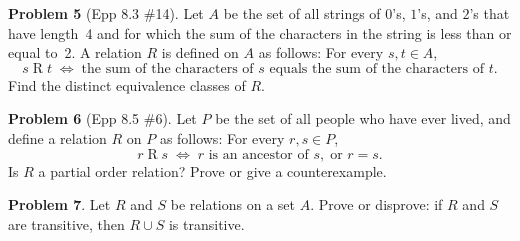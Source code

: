 \documentclass[11pt]{article}
\begin{document}
\bigskip

\noindent\textbf{Problem 5} (Epp 8.3 \#14). \;
Let $A$ be the set of all strings of $0$'s, $1$'s, and $2$'s that have length~4 and
for which the sum of the characters in the string is less than or equal to~2.
A relation $R$ is defined on $A$ as follows: For every $s, t \in A$,
\[
  s \mathrel{R} t \;\iff\; \text{the sum of the characters of } s
    \text{ equals the sum of the characters of } t.
\]
Find the distinct equivalence classes of $R$.

\bigskip

\noindent\textbf{Problem 6} (Epp 8.5 \#6). \;
Let $P$ be the set of all people who have ever lived, and define a relation $R$
on $P$ as follows: For every $r, s \in P$,
\[
  r \mathrel{R} s \;\iff\; r \text{ is an ancestor of } s,\; \text{or } r = s.
\]
Is $R$ a partial order relation?  Prove or give a counterexample.

\bigskip

\noindent\textbf{Problem 7}. \;
Let $R$ and $S$ be relations on a set $A$.
Prove or disprove: if $R$ and $S$ are transitive, then $R \cup S$ is transitive.
\end{document}
